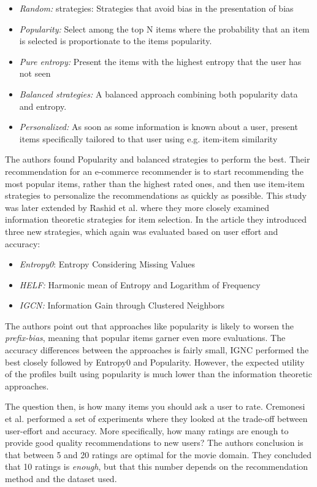 \begin{itemize}
\item \emph{Random:} strategies: Strategies that avoid bias in the presentation
of bias
\item \emph{Popularity:} Select among the top N items where the probability
that an item is selected is proportionate to the items popularity.
\item \emph{Pure entropy:} Present the items with the highest entropy that the
user has not seen
\item \emph{Balanced strategies:} A balanced approach combining both popularity
data and entropy.
\item \emph{Personalized:} As soon as some information is known about a user,
present items specifically tailored to that user using e.g. item-item
similarity
\end{itemize}

The authors found Popularity and balanced strategies to perform the best. Their
recommendation for an e-commerce recommender is to start recommending the most
popular items, rather than the highest rated ones, and then use item-item
strategies to personalize the recommendations as quickly as possible. This
study was later extended by Rashid et al. \cite{Rashid2008} where they more
closely examined information theoretic strategies for item selection. In the
article they introduced three new strategies, which again was evaluated based
on user effort and accuracy:

\begin{itemize}
\item \emph{Entropy0}: Entropy Considering Missing Values
\item \emph{HELF:} Harmonic mean of Entropy and Logarithm of Frequency
\item \emph{IGCN:} Information Gain through Clustered Neighbors
\end{itemize}

The authors point out that approaches like popularity is likely to worsen the
\emph{prefix-bias}, meaning that popular items garner even more evaluations.
The accuracy differences between the approaches is fairly small, IGNC performed
the best closely followed by Entropy0 and Popularity. However, the expected
utility of the profiles built using popularity is much lower than the
information theoretic approaches.\linebreak[4]

The question then, is how many items you should ask a user to rate. Cremonesi
et al. \cite{Cremonesi2012} performed a set of experiments where they looked
at the trade-off between user-effort and accuracy. More specifically, how many
ratings are enough to provide good quality recommendations to new users? The
authors conclusion is that between 5 and 20 ratings are optimal for the movie
domain. They concluded that 10 ratings is \emph{enough}, but that this number
depends on the recommendation method and the dataset used.

